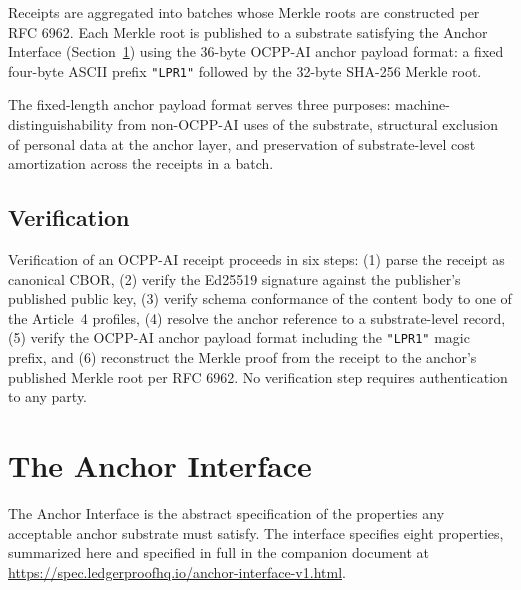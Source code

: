 \documentclass[11pt,a4paper]{article}
\begin{document}
Receipts are aggregated into batches whose Merkle roots are constructed per RFC 6962. Each Merkle root is published to a substrate satisfying the Anchor Interface (Section~\ref{sec:anchor}) using the 36-byte OCPP-AI anchor payload format: a fixed four-byte ASCII prefix \texttt{"LPR1"} followed by the 32-byte SHA-256 Merkle root.

The fixed-length anchor payload format serves three purposes: machine-distinguishability from non-OCPP-AI uses of the substrate, structural exclusion of personal data at the anchor layer, and preservation of substrate-level cost amortization across the receipts in a batch.

\subsection{Verification}

Verification of an OCPP-AI receipt proceeds in six steps: (1) parse the receipt as canonical CBOR, (2) verify the Ed25519 signature against the publisher's published public key, (3) verify schema conformance of the content body to one of the Article~4 profiles, (4) resolve the anchor reference to a substrate-level record, (5) verify the OCPP-AI anchor payload format including the \texttt{"LPR1"} magic prefix, and (6) reconstruct the Merkle proof from the receipt to the anchor's published Merkle root per RFC 6962. No verification step requires authentication to any party.

\section{The Anchor Interface}
\label{sec:anchor}

The Anchor Interface is the abstract specification of the properties any acceptable anchor substrate must satisfy. The interface specifies eight properties, summarized here and specified in full in the companion document at \url{https://spec.ledgerproofhq.io/anchor-interface-v1.html}.
\end{document}
